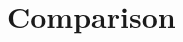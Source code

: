 \documentclass[12pt,a4paper,twocolumns]{report}
\begin{document}
\chapter{Comparison}

\end{document}
